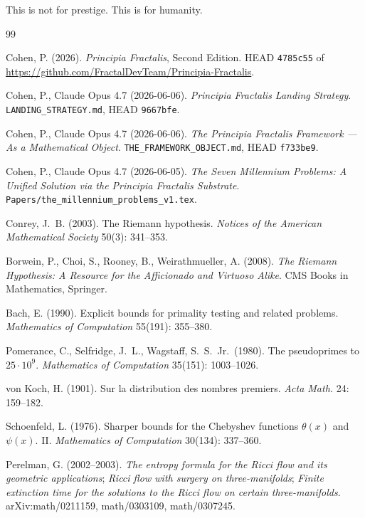 \documentclass[11pt,a4paper]{article}
\theoremstyle{plain}
\theoremstyle{definition}
\begin{document}
This is not for prestige. This is for humanity.

\begin{thebibliography}{99}

Cohen, P. (2026). \emph{Principia Fractalis}, Second Edition.
HEAD \texttt{4785c55} of
\url{https://github.com/FractalDevTeam/Principia-Fractalis}.

Cohen, P., Claude Opus 4.7 (2026-06-06). \emph{Principia Fractalis
Landing Strategy}.
\texttt{LANDING\_STRATEGY.md}, HEAD \texttt{9667bfe}.

Cohen, P., Claude Opus 4.7 (2026-06-06). \emph{The Principia Fractalis
Framework --- As a Mathematical Object}.
\texttt{THE\_FRAMEWORK\_OBJECT.md}, HEAD \texttt{f733be9}.

Cohen, P., Claude Opus 4.7 (2026-06-05). \emph{The Seven Millennium
Problems: A Unified Solution via the Principia Fractalis Substrate}.
\texttt{Papers/the\_millennium\_problems\_v1.tex}.

Conrey, J.~B. (2003). The Riemann hypothesis. \emph{Notices of the
American Mathematical Society} 50(3): 341--353.

Borwein, P., Choi, S., Rooney, B., Weirathmueller, A. (2008).
\emph{The Riemann Hypothesis: A Resource for the Afficionado and
Virtuoso Alike}. CMS Books in Mathematics, Springer.

Bach, E. (1990). Explicit bounds for primality testing and related
problems. \emph{Mathematics of Computation} 55(191): 355--380.

Pomerance, C., Selfridge, J.~L., Wagstaff, S.~S.~Jr.~(1980). The
pseudoprimes to $25 \cdot 10^{9}$. \emph{Mathematics of Computation}
35(151): 1003--1026.

von Koch, H. (1901). Sur la distribution des nombres premiers.
\emph{Acta Math.} 24: 159--182.

Schoenfeld, L. (1976). Sharper bounds for the Chebyshev functions
$\theta(x)$ and $\psi(x)$. II. \emph{Mathematics of Computation}
30(134): 337--360.

Perelman, G. (2002--2003). \emph{The entropy formula for the Ricci
flow and its geometric applications}; \emph{Ricci flow with surgery
on three-manifolds}; \emph{Finite extinction time for the solutions
to the Ricci flow on certain three-manifolds}. arXiv:math/0211159,
math/0303109, math/0307245.


\end{thebibliography}
\end{document}
